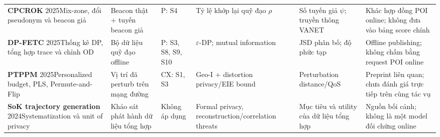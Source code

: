 \begin{longtable}{@{}P{2.75cm}P{2.15cm}P{1.6cm}P{2.4cm}P{2.5cm}P{3.194cm}@{}}
\textbf{CPCROK} 2025\cite{cpcrok}\newline Mix-zone, đổi pseudonym và beacon giả & Beacon thật + tuyến beacon giả & P: S4 & Tỷ lệ khớp lại quỹ đạo $\rho$ & Số tuyến giả $\psi$; truyền thông VANET & Khác hợp đồng POI online; không đưa vào bảng score chính \\
\textbf{DP-FETC} 2025\cite{dpfetc}\newline Thống kê DP, tổng hợp trace và chỉnh OD & Bộ dữ liệu quỹ đạo offline & P: S3, S8, S9, S10 & $\varepsilon$-DP; mutual information & JSD phân bố; độ phức tạp & Offline publishing; không chấm bằng request POI online \\
\textbf{PTPPM} 2025\cite{ptppm}\newline Personalized budget, PLS, Permute-and-Flip & Vị trí đã perturb trên mạng đường & CX: S1, S3 & Geo-I + distortion privacy/EIE bound & Perturbation distance/QoS & Preprint liên quan; chưa đánh giá trực tiếp trên cùng tác vụ \\
\textbf{SoK trajectory generation} 2024\cite{sok}\newline Systematization và unit of privacy & Khảo sát phát hành dữ liệu tổng hợp & Không áp dụng & Formal privacy, reconstruction/correlation threats & Mục tiêu và utility của dữ liệu tổng hợp & Nguồn bối cảnh; không là một model đối chứng online \\
\end{longtable}\endgroup\par
